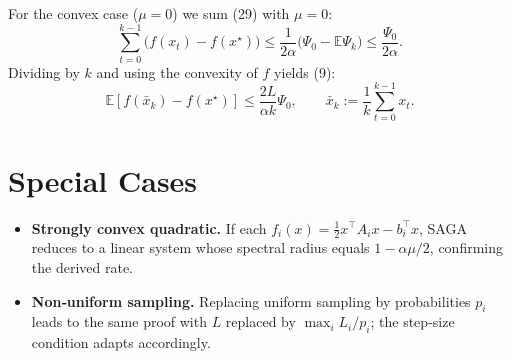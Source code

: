 \documentclass{article}
\begin{document}
For the convex case ($\mu=0$) we sum (29) with $\mu=0$:
\[
\sum_{t=0}^{k-1}\bigl(f(x_t)-f(x^\star)\bigr)
   \le \frac{1}{2\alpha}\bigl(\Psi_0-\mathbb{E}\Psi_k\bigr)
   \le \frac{\Psi_0}{2\alpha}.
\]
Dividing by $k$ and using the convexity of $f$ yields (9):
\[
\mathbb{E}[f(\bar x_k)-f(x^\star)]\le\frac{2L}{\alpha k}\Psi_0,
\qquad\bar x_k:=\frac1k\sum_{t=0}^{k-1}x_t .
\]

\section*{Special Cases}
\begin{itemize}
\item \textbf{Strongly convex quadratic.}
If each $f_i(x)=\frac12 x^\top A_i x-b_i^\top x$, SAGA reduces to a linear
system whose spectral radius equals $1-\alpha\mu/2$, confirming the
derived rate.
\item \textbf{Non‑uniform sampling.}
Replacing uniform sampling by probabilities $p_i$ leads to the same proof
with $L$ replaced by $\max_i L_i/p_i$; the step‑size condition adapts
accordingly.
\end{itemize}
\end{document}
